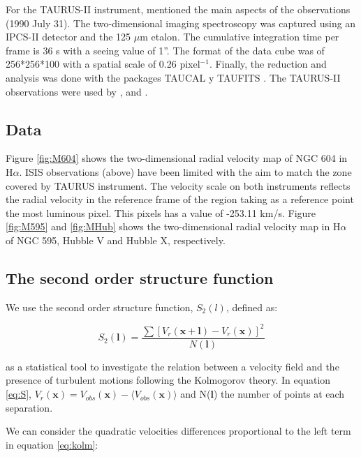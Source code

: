 \documentclass[fleqn,usenatbib]{mnras}
\begin{document}
For the TAURUS-II instrument, \cite{sabalisck1995supersonic} mentioned the main aspects of the observations (1990 July 31). The two-dimensional imaging spectroscopy was captured using an IPCS-II detector and the 125 $\mu$m etalon. The cumulative integration time per frame is 36 s with a seeing value of 1''. The format of the data cube was of 256*256*100 with a spatial scale of 0.26 pixel$^{-1}$. Finally, the reduction and analysis was done with the packages TAUCAL y TAUFITS \citep{1992ASPC...25..445L}.
The TAURUS-II observations were used by \cite{sabalisck1995supersonic}, \cite{tanco1997} and \cite{2019arXiv191203543M}.

\subsection{Data}

Figure \ref{fig:M604} shows the two-dimensional radial velocity map of NGC 604 in H$\alpha$. ISIS observations (above) have been limited with the aim to match the zone covered by TAURUS instrument. The velocity scale on both instruments reflects the radial velocity in the reference frame of the region taking as a reference point the most luminous pixel. This pixels has a value of -253.11 km/s. Figure \ref{fig:M595} and \ref{fig:MHub} shows the two-dimensional radial velocity map in H$\alpha$ of NGC 595, Hubble V and Hubble X, respectively.

\subsection{The second order structure function}

We use the second order structure function, $S_{2}(l)$, defined as:

\begin{equation}\label{eq:S}
S_{2}(\boldsymbol{l})=\dfrac{\sum[V_{r}(\boldsymbol{x}+\boldsymbol{l})-V_{r}(\boldsymbol{x}) ]^{2}}{N(\boldsymbol{l})}
\end{equation}

as a statistical tool to investigate the relation between a velocity field and the presence of turbulent motions following the Kolmogorov theory. In equation \ref{eq:S}, $V_{r}(\boldsymbol{x})= V_{obs}(\boldsymbol{x})-\langle V_{obs}(\boldsymbol{x}) \rangle$ and N($\boldsymbol{l}$) the number of points at each separation. 

We can consider the quadratic velocities differences proportional to the left term in equation \ref{eq:kolm}:
\end{document}
